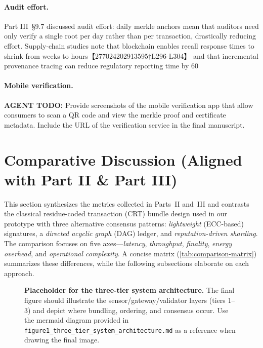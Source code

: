\paragraph{Audit effort.}
Part III~\S9.7 discussed audit effort: daily merkle anchors mean that auditors need only verify a single root per day rather than per transaction, drastically reducing effort.  Supply‑chain studies note that blockchain enables recall response times to shrink from weeks to hours【277024202913595†L296-L304】 and that incremental provenance tracing can reduce regulatory reporting time by 60 %

\paragraph{Mobile verification.}
\textbf{AGENT TODO:} Provide screenshots of the mobile verification app that allow consumers to scan a QR code and view the merkle proof and certificate metadata.  Include the URL of the verification service in the final manuscript.


\section{Comparative Discussion (Aligned with Part II \& Part III)}
\label{sec:comparative-discussion}

This section synthesizes the metrics collected in Parts~II and~III and contrasts the classical residue-coded transaction (CRT) bundle design used in our prototype with three alternative consensus patterns: \emph{lightweight} (ECC-based) signatures, a \emph{directed acyclic graph} (DAG) ledger, and \emph{reputation-driven sharding}. The comparison focuses on five axes—\emph{latency}, \emph{throughput}, \emph{finality}, \emph{energy overhead}, and \emph{operational complexity}. A concise matrix (\autoref{tab:comparison-matrix}) summarizes these differences, while the following subsections elaborate on each approach.

\begin{figure}[h]
  \centering
  \caption{\textbf{Placeholder for the three-tier system architecture.} The final figure should illustrate the sensor/gateway/validator layers (tiers 1–3) and depict where bundling, ordering, and consensus occur. Use the mermaid diagram provided in \texttt{figure1\_three\_tier\_system\_architecture.md} as a reference when drawing the final image.}
  \label{fig:three-tier-architecture}
\end{figure}

